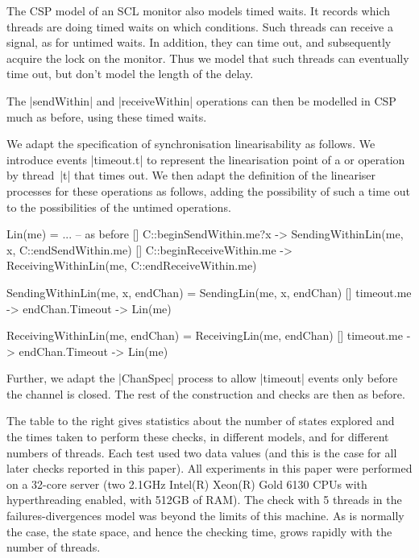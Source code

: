 The CSP model of an SCL monitor also models timed waits.  It records which
threads are doing timed waits on which conditions.  Such threads can receive a
signal, as for untimed waits.  In addition, they can time out, and
subsequently acquire the lock on the monitor.  Thus we model that such threads
can eventually time out, but don't model the length of the delay.

The |sendWithin| and |receiveWithin| operations can then be modelled in CSP
much as before, using these timed waits.



\inlineCSP

We adapt the specification of synchronisation linearisability as follows.  We
introduce events |timeout.t| to represent the linearisation point of a
 or  operation by thread~|t| that times
out.  We then adapt the definition of the lineariser processes for these
operations as follows, adding the possibility of such a time out to the
possibilities of the untimed operations.
%
\begin{cspm}
Lin(me) = 
  ... -- as before
  [] C::beginSendWithin.me?x -> SendingWithinLin(me, x, C::endSendWithin.me)
  [] C::beginReceiveWithin.me -> ReceivingWithinLin(me, C::endReceiveWithin.me)

SendingWithinLin(me, x, endChan) = 
  SendingLin(me, x, endChan)
  [] timeout.me -> endChan.Timeout -> Lin(me)

ReceivingWithinLin(me, endChan) = 
  ReceivingLin(me, endChan) 
  [] timeout.me -> endChan.Timeout -> Lin(me)
\end{cspm}
%
Further, we adapt the |ChanSpec| process to allow |timeout| events only before
the channel is closed.  The rest of the construction and checks are then as
before. 

%
The table to the right gives statistics about the number of states explored
and the times taken to perform these checks, in different models, and for
different numbers of threads.  Each test used two data values (and this is the
case for all later checks reported in this paper).  All
experiments in this paper were performed on a 32-core server (two 2.1GHz
Intel(R) Xeon(R) Gold 6130 CPUs with hyperthreading enabled, with 512GB of
RAM).  The check with 5 threads in the failures-divergences model was beyond
the limits of this machine.  As is normally the case, the state space, and
hence the checking time, grows rapidly with the number of threads.   
\end{window}


